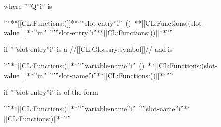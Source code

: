 \noindent where ''{''Q''}\sub i'' is

''''\vbox{\hbox{**[[CL:Functions:(]]**''{''slot-entry''}\sub i'' () **[[CL:Functions:(slot-value ]]**''in'' '''{''slot-entry''}\sub i''**[[CL:Functions:))]]**}}''''

\noindent if ''{''slot-entry''}\sub i'' is a //[[CL:Glossary:symbol]]// and is

''''{\vbox{\hbox{**[[CL:Functions:(]]**''{''variable-name''}\sub i'' () **[[CL:Functions:(slot-value ]]**''in'' '''{''slot-name''}\sub i''**[[CL:Functions:))]]**}}}''''

\noindent if ''{''slot-entry''}\sub i'' is of the form

''''\vbox{\hbox{**[[CL:Functions:(]]**''{''variable-name''}\sub i'' ''{''slot-name''}\sub i''**[[CL:Functions:)]]**}}''''

